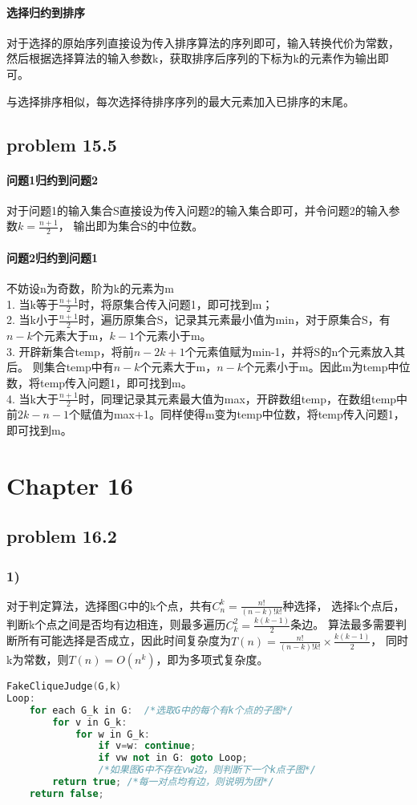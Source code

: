 \documentclass[11pt,a4paper,oneside,oldfontcommands]{ctexart}
\begin{document}
\paragraph*{选择归约到排序}对于选择的原始序列直接设为传入排序算法的序列即可，输入转换代价为常数，
然后根据选择算法的输入参数k，获取排序后序列的下标为k的元素作为输出即可。

\noindent 与选择排序相似，每次选择待排序序列的最大元素加入已排序的末尾。
{\subsection*{problem 15.5}}
\paragraph*{问题1归约到问题2}
对于问题1的输入集合S直接设为传入问题2的输入集合即可，并令问题2的输入参数$k=\frac{n+1}{2}$，
输出即为集合S的中位数。
\paragraph*{问题2归约到问题1}不妨设n为奇数，阶为k的元素为m\\
	1. 当k等于$\frac{n+1}{2}$时，将原集合传入问题1，即可找到m；\\
	2. 当k小于$\frac{n+1}{2}$时，遍历原集合S，记录其元素最小值为min，对于原集合S，有$n-k$个元素大于m，$k-1$个元素小于m。\\
	3. 开辟新集合temp，将前$n-2k+1$个元素值赋为min-1，并将S的n个元素放入其后。
	则集合temp中有$n-k$个元素大于m，$n-k$个元素小于m。因此m为temp中位数，将temp传入问题1，即可找到m。\\
	4. 当k大于$\frac{n+1}{2}$时，同理记录其元素最大值为max，开辟数组temp，在数组temp中前$2k-n-1$个赋值为max+1。同样使得m变为temp中位数，将temp传入问题1，即可找到m。\\
\newpage
\section*{Chapter 16}
{\subsection*{problem 16.2}}
\subsubsection*{1)}
对于判定算法，选择图G中的k个点，共有$C_n^k=\frac{n!}{(n-k)!k!}$种选择，
选择k个点后，判断k个点之间是否均有边相连，则最多遍历$C_k^2=\frac{k(k-1)}{2}$条边。
算法最多需要判断所有可能选择是否成立，因此时间复杂度为$T(n)=\frac{n!}{(n-k)!k!}\times\frac{k(k-1)}{2}$，
同时k为常数，则$T(n)=O(n^k)$，即为多项式复杂度。
\begin{lstlisting}[language=C++,title=FakeCliqueJudge.func]
FakeCliqueJudge(G,k)
Loop:
	for each G_k in G:  /*选取G中的每个有k个点的子图*/
		for v in G_k:
			for w in G_k:
				if v=w: continue;
				if vw not in G: goto Loop;
				/*如果图G中不存在vw边，则判断下一个k点子图*/
		return true; /*每一对点均有边，则说明为团*/
	return false;
\end{lstlisting}
\end{document}
